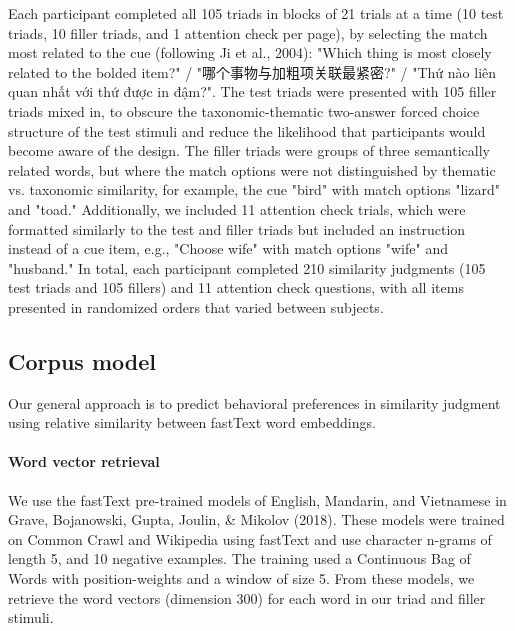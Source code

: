 \documentclass[10pt, letterpaper]{article}
\begin{document}
\begin{CJK*}{UTF8}{gbsn}
Each participant completed all 105 triads in blocks of 21 trials at a time (10 test triads, 10 filler triads, and 1 attention check per page), by selecting the match most related to the cue (following Ji et al., 2004): "Which thing is most closely related to the bolded item?" / "哪个事物与加粗项关联最紧密?" / "Thứ nào liên quan nhất với thứ được in đậm?".
The test triads were presented with 105 filler triads mixed in, to obscure the taxonomic-thematic two-answer forced choice structure of the test stimuli and reduce the likelihood that participants would become aware of the design.
The filler triads were groups of three semantically related words, but where the match options were not distinguished by thematic vs. taxonomic similarity, for example, the cue "bird" with match options "lizard" and "toad." Additionally, we included 11 attention check trials, which were formatted similarly to the test and filler triads but included an instruction instead of a cue item, e.g., "Choose wife" with match options "wife" and "husband." In total, each participant completed 210 similarity judgments (105 test triads and 105 fillers) and 11 attention check questions, with all items presented in randomized orders that varied between subjects.
\end{CJK*}

\hypertarget{corpus-model}{%
\subsection{Corpus model}\label{corpus-model}}

Our general approach is to predict behavioral preferences in similarity
judgment using relative similarity between fastText word embeddings.

\hypertarget{word-vector-retrieval}{%
\paragraph{Word vector retrieval}\label{word-vector-retrieval}}

We use the fastText pre-trained models of English, Mandarin, and
Vietnamese in Grave, Bojanowski, Gupta, Joulin, \& Mikolov (2018). These
models were trained on Common Crawl and Wikipedia using fastText and use
character n-grams of length 5, and 10 negative examples. The training
used a Continuous Bag of Words with position-weights and a window of
size 5. From these models, we retrieve the word vectors (dimension 300)
for each word in our triad and filler stimuli.
\end{document}
